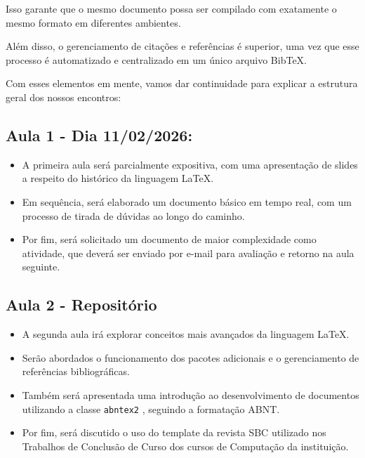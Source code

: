 \documentclass{article}
\begin{document}
\begin{itemize}
\begin{itemize}
		Isso garante que o mesmo documento possa ser compilado com exatamente o mesmo formato em diferentes ambientes. 
		
		Além disso, o gerenciamento de citações e referências é superior, uma vez que esse processo é automatizado e centralizado em um único arquivo BibTeX.
	\end{itemize}

	\end{itemize}
	

	
    Com esses elementos em mente, vamos dar continuidade para explicar a estrutura geral dos nossos encontros:
	
	\subsection*{Aula 1 - Dia 11/02/2026:}
	
\begin{itemize}
	\item A primeira aula será parcialmente expositiva, com uma apresentação de slides a respeito do histórico da linguagem LaTeX.
	\item Em sequência, será elaborado um documento básico em tempo real, com um processo de tirada de dúvidas ao longo do caminho.
	\item Por fim, será solicitado um documento de maior complexidade como atividade, que deverá ser enviado por e-mail para avaliação e retorno na aula seguinte.
\end{itemize}

	
	
	\subsection*{Aula 2 - Repositório}
	
\begin{itemize}
	\item A segunda aula irá explorar conceitos mais avançados da linguagem LaTeX.
	\item Serão abordados o funcionamento dos pacotes adicionais e o gerenciamento de referências bibliográficas.
	\item Também será apresentada uma introdução ao desenvolvimento de documentos utilizando a classe \texttt{abntex2} \cite{abntex2}, seguindo a formatação ABNT.
	\item Por fim, será discutido o uso do template da revista SBC \cite{sbc-template} utilizado nos Trabalhos de Conclusão de Curso dos cursos de Computação da instituição.
\end{itemize}

	
	
	
	
\end{document}
